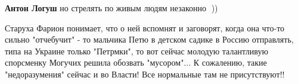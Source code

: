 \begin{itemize}
\begin{itemize}
\textbf{Антон Логуш} но стрелять по живым людям незаконно 🤔))
\end{itemize}

 

Старуха Фарион понимает, что о ней вспомнят и заговорят, когда она что-то
сильно "отчебучит" - то мальчика Петю в детском садике в Россию отправлять,
типа на Украине только "Петрмки", то вот сейчас молодую талантливую спорсменку
Могучих решила обозвать "мусором"... К сожалению, такие "недоразумения" сейчас
и во Власти! Все нормальные там не присутствуют!!
\end{itemize}


